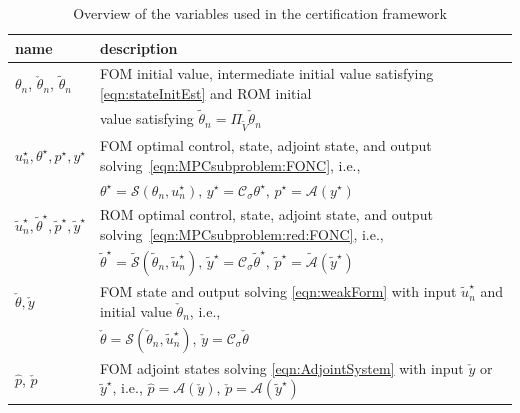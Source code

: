 \documentclass[reqno]{amsart}
\newcommand{\state}{\theta}
\newcommand{\adState}{p}
\newcommand{\inpVar}{u}
\newcommand{\outVar}{y}
\newcommand{\cOper}{\calC}
\newcommand{\solper}{\calS}
\newcommand{\solA}{\mathcal{A}}
\newcommand{\intermediateInitState}{\intermediateState_n}%
\newcommand{\optState}{\state^\star}
\newcommand{\optAdState}{\adState^\star}
\newcommand{\optInpVar}[1]{\inpVar_{#1}^\star}
\newcommand{\optInpVarN}{\optInpVar{n}}
\newcommand{\optOutVar}{\outVar^\star}
\newcommand{\switch}{\sigma}
\newcommand{\reduce}[1]{\tilde{#1}}
\newcommand{\Vred}{\reduce{V}}
\newcommand{\projVred}{\Pi_{\Vred}}
\newcommand{\stateRed}{\reduce{\state}}
\newcommand{\adStateRed}{\reduce{\adState}}
\newcommand{\outVarRed}{\reduce{\outVar}}
\newcommand{\optStateRed}{\stateRed^\star}
\newcommand{\optAdStateRed}{\adStateRed^\star}
\newcommand{\optInpVarRed}[1]{\reduce{\inpVar}_{#1}^\star}
\newcommand{\optInpVarRedN}{\optInpVarRed{n}}
\newcommand{\optOutVarRed}{\outVarRed^\star}
\newcommand{\intermediateState}{\check{\state}}
\newcommand{\intermediateAdStateA}{{\hat \adState}}
\newcommand{\intermediateAdStateB}{\check{\adState}}
\newcommand{\intermediateOutVar}{\check{\outVar}}
\newcommand{\calC}{\mathcal{C}}
\newcommand{\calS}{\mathcal{S}}
\newcommand{\abbr}[1]{\textsf{#1}\xspace}
\newcommand{\FOM}{\abbr{FOM}}
\newcommand{\ROM}{\abbr{ROM}}
\begin{document}
%
\begin{table}[t]
    \centering
    \begin{tabular}{ll}
        \toprule
        \textbf{name} & \textbf{description}\\\midrule
        $\state_n$, $\intermediateInitState$, $\stateRed_n$ & \FOM initial value, intermediate initial value satisfying \eqref{eqn:stateInitEst} and \ROM initial\\
        & value satisfying $\stateRed_n= \projVred\intermediateInitState$\\
        $\optInpVarN,\optState,\optAdState,\optOutVar$ & \FOM optimal control, state, adjoint state, and output solving~\eqref{eqn:MPCsubproblem:FONC}, i.e.,\\ & $\optState=\solper(\state_n,\optInpVarN),\,\optOutVar=\cOper_\switch\optState,\, \optAdState=\solA(\optOutVar)$ \\
        $\optInpVarRedN,\optStateRed,\optAdStateRed,\optOutVarRed$ & \ROM optimal control, state, adjoint state, and output solving~\eqref{eqn:MPCsubproblem:red:FONC}, i.e.,  \\
        & $\optStateRed=\reduce \solper(\stateRed_n,\optInpVarRedN),\, \optOutVarRed=\cOper_\switch\optStateRed,\,{\optAdStateRed}=\reduce \solA(\optOutVarRed)$ \\
        $\intermediateState,\intermediateOutVar$ & \FOM state and output solving \eqref{eqn:weakForm} with input $\optInpVarRedN$ and initial value $\intermediateInitState$, i.e.,\\
        & $\intermediateState=\solper(\intermediateInitState,\optInpVarRedN)$, $\intermediateOutVar=\cOper_\switch\intermediateState$\\
        $\intermediateAdStateA$, $\intermediateAdStateB$ & \FOM adjoint states solving \eqref{eqn:AdjointSystem} with input $\intermediateOutVar$ or $\optOutVarRed$, i.e.,
        $\intermediateAdStateA=\solA(\intermediateOutVar)$, $\intermediateAdStateB=\solA(\optOutVarRed)$\\\bottomrule
    \end{tabular}
    \caption{Overview of the variables used in the certification framework}
    \label{tab:overviewVars}
\end{table}
%
\end{document}
